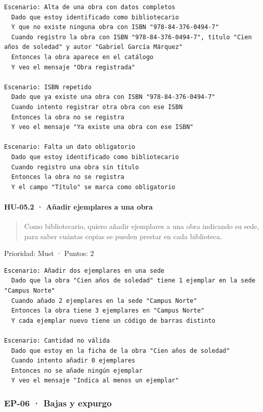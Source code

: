 \begin{Verbatim}[breaklines,fontsize=\small,frame=single,framerule=0.4pt,rulecolor=\color{black!25}]
Escenario: Alta de una obra con datos completos
  Dado que estoy identificado como bibliotecario
  Y que no existe ninguna obra con ISBN "978-84-376-0494-7"
  Cuando registro la obra con ISBN "978-84-376-0494-7", título "Cien años de soledad" y autor "Gabriel García Márquez"
  Entonces la obra aparece en el catálogo
  Y veo el mensaje "Obra registrada"

Escenario: ISBN repetido
  Dado que ya existe una obra con ISBN "978-84-376-0494-7"
  Cuando intento registrar otra obra con ese ISBN
  Entonces la obra no se registra
  Y veo el mensaje "Ya existe una obra con ese ISBN"

Escenario: Falta un dato obligatorio
  Dado que estoy identificado como bibliotecario
  Cuando registro una obra sin título
  Entonces la obra no se registra
  Y el campo "Título" se marca como obligatorio
\end{Verbatim}

\paragraph*{HU-05.2 · Añadir ejemplares a una obra}

\begin{quote}
Como bibliotecario, quiero añadir ejemplares a una obra indicando su sede, para saber cuántas copias se pueden prestar en cada biblioteca.
\end{quote}

Prioridad: Must · Puntos: 2

\begin{Verbatim}[breaklines,fontsize=\small,frame=single,framerule=0.4pt,rulecolor=\color{black!25}]
Escenario: Añadir dos ejemplares en una sede
  Dado que la obra "Cien años de soledad" tiene 1 ejemplar en la sede "Campus Norte"
  Cuando añado 2 ejemplares en la sede "Campus Norte"
  Entonces la obra tiene 3 ejemplares en "Campus Norte"
  Y cada ejemplar nuevo tiene un código de barras distinto

Escenario: Cantidad no válida
  Dado que estoy en la ficha de la obra "Cien años de soledad"
  Cuando intento añadir 0 ejemplares
  Entonces no se añade ningún ejemplar
  Y veo el mensaje "Indica al menos un ejemplar"
\end{Verbatim}

\subsubsection*{EP-06 · Bajas y expurgo}

